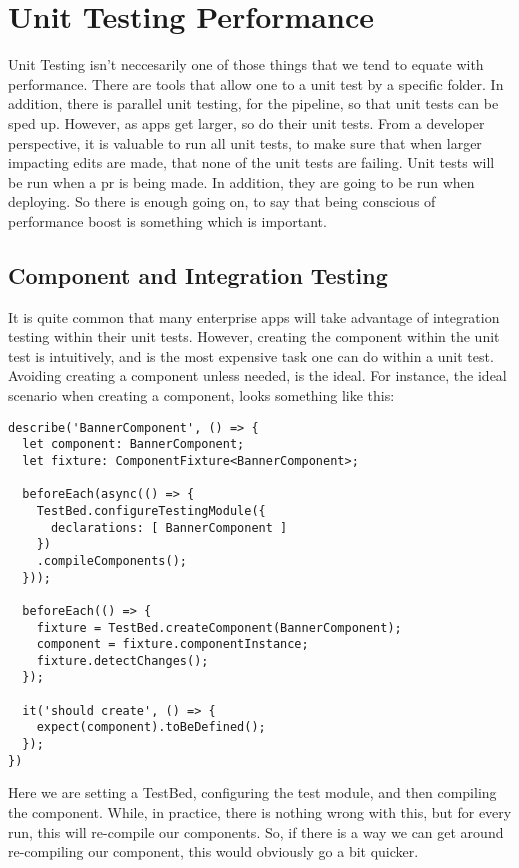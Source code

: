 \maketitle{}
\section{ Unit Testing Performance }

Unit Testing isn't neccesarily one of those things that we tend to equate with
performance. There are tools that allow one to a unit test by a specific folder.
In addition, there is parallel unit testing, for the pipeline, so that unit
tests can be sped up. However, as apps get larger, so do their unit tests. From
a developer perspective, it is valuable to run all unit tests, to make sure
that when larger impacting edits are made, that none of the unit tests are
failing. Unit tests will be run when a pr is being made. In addition, they are
going to be run when deploying. So there is enough going on, to say that being
conscious of performance boost is something which is important.

\subsection{ Component and Integration Testing }
It is quite common that many enterprise apps will take advantage of integration
testing within their unit tests. However, creating the component within the unit
test is intuitively, and is the most expensive task one can do within a unit
test. Avoiding creating a component unless needed, is the ideal. For instance,
the ideal scenario when creating a component, looks something like this:
\begin{lstlisting}
describe('BannerComponent', () => {
  let component: BannerComponent;
  let fixture: ComponentFixture<BannerComponent>;

  beforeEach(async(() => {
    TestBed.configureTestingModule({
      declarations: [ BannerComponent ]
    })
    .compileComponents();
  }));

  beforeEach(() => {
    fixture = TestBed.createComponent(BannerComponent);
    component = fixture.componentInstance;
    fixture.detectChanges();
  });

  it('should create', () => {
    expect(component).toBeDefined();
  });
})
\end{lstlisting}

Here we are setting a TestBed, configuring the test module, and then compiling
the component. While, in practice, there is nothing wrong with this, but for
every run, this will re-compile our components. So, if there is a way we can
get around re-compiling our component, this would obviously go a bit quicker.
